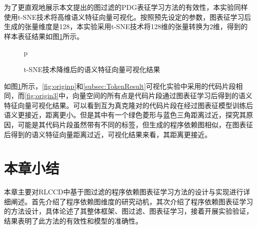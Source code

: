 为了更直观地展示本文提出的图过滤的PDG表征学习方法的有效性，本实验同样使用t-SNE技术将高维语义特征向量可视化。按照预先设定的参数，图表征学习后生成的张量维度是128，本实验采用t-SNE技术将128维的张量转换为2维，得到的样本表征结果如图\ref{fig:originthree}所示。

\begin{figure}[H] 
  \centering  %
  p
  \caption{t-SNE技术降维后的语义特征向量可视化结果}    %
  \label{fig:originthree}    %
\end{figure}

如图\ref{fig:originthree}所示，\ref{fig:originp}和\ref{subsec:TokenResult}可视化实验中采用的代码片段相同，而\ref{fig:origin3}中，向量空间的所有点是代码片段通过图表征学习后得到的语义特征向量可视化结果。可以看到互为真克隆对的代码片段在经过图表征模型训练后语义更接近，距离更小。但是其中有一个绿色菱形与蓝色三角距离过近，探究其原因，可能是其代码片段虽然带有不同的标签，但生成的程序依赖图相似，在图表征后得到的语义特征向量距离过近，可视化结果来看，其距离更接近。

\section{本章小结}
\label{sec:Summary5}
本章主要对RLCCD中基于图过滤的程序依赖图表征学习方法的设计与实现进行详细阐述。首先介绍了程序依赖图维度的研究动机，其次介绍了程序依赖图表征学习的方法设计，具体论述了其整体框架、图过滤、图表征学习，接着开展实验验证，结果表明了此方法的有效性和模型的准确性。



